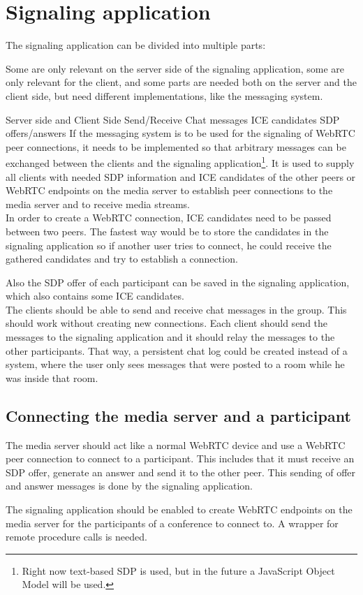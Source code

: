 \documentclass[../../../thesis.tex]{subfiles}
\begin{document}
\section{Signaling application}

The signaling application can be divided into multiple parts: \par
Some are only relevant on the server side of the signaling application, some are only relevant for the client, and some parts are needed both on the server and the client side, but need different implementations, like the messaging system.\par
\comment
Server side and Client Side
	Send/Receive
		Chat messages
		ICE candidates
		SDP offers/answers
\endcomment
If the messaging system is to be used for the signaling of WebRTC peer connections, it needs to be implemented so that arbitrary messages can be exchanged between the clients and the signaling application\footnote{Right now text-based SDP is used, but in the future a JavaScript Object Model will be used\cite{ortc-api}.}. It is used to supply all clients with needed SDP information and ICE candidates of the other peers or WebRTC endpoints on the media server to establish peer connections to the media server and to receive media streams.\\

In order to create a WebRTC connection, ICE candidates need to be passed between two peers. The fastest way would be to store the candidates in the signaling application so if another user tries to connect, he could receive the gathered candidates and try to establish a connection.\par

Also the SDP offer of each participant can be saved in the signaling application, which also contains some ICE candidates.\\

The clients should be able to send and receive chat messages in the group. This should work without creating new connections. Each client should send the messages to the signaling application and it should relay the messages to the other participants. That way, a persistent chat log could be created instead of a system, where the user only sees messages that were posted to a room while he was inside that room.\\

\subsection{Connecting the media server and a participant}
The media server should act like a normal WebRTC device and use a WebRTC peer connection to connect to a participant. This includes that it must receive an SDP offer, generate an answer and send it to the other peer. This sending of offer and answer messages is done by the signaling application.\par
The signaling application should be enabled to create WebRTC endpoints on the media server for the participants of a conference to connect to. A wrapper for remote procedure calls is needed.
\end{document}
